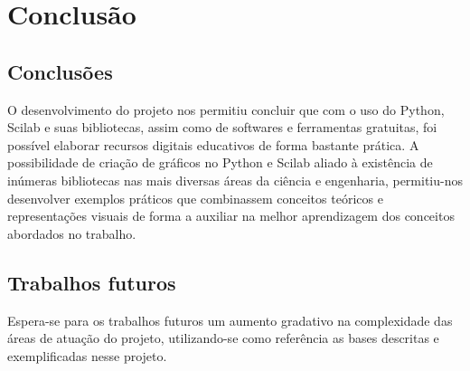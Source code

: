 \chapter{Conclusão}

\section{Conclusões}
O desenvolvimento do projeto nos permitiu concluir que com o uso do Python, Scilab e suas bibliotecas, assim como de softwares e ferramentas gratuitas, foi possível elaborar recursos digitais educativos de forma bastante prática. A possibilidade de criação de gráficos no Python e Scilab aliado à existência de inúmeras bibliotecas nas mais diversas áreas da ciência e engenharia, permitiu-nos desenvolver exemplos práticos que combinassem conceitos teóricos e representações visuais de forma a auxiliar na melhor aprendizagem dos conceitos abordados no trabalho. 

\section{Trabalhos futuros}
Espera-se para os trabalhos futuros um aumento gradativo na complexidade das áreas de atuação do projeto, utilizando-se como referência as bases descritas e exemplificadas nesse projeto.